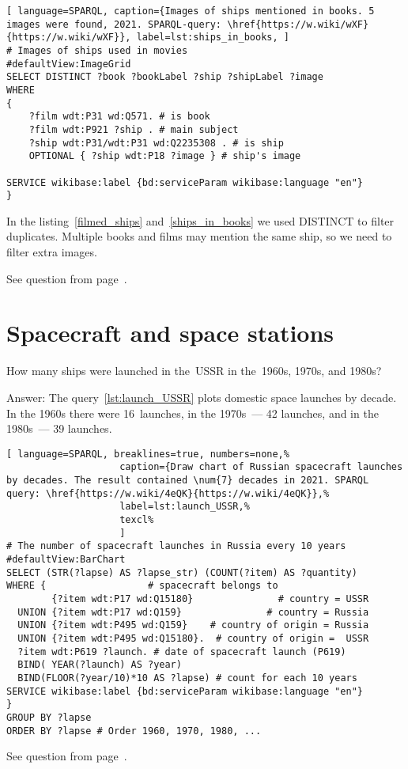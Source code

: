 \begin{lstlisting}[ language=SPARQL, caption={Images of ships mentioned in books. 5 images were found, 2021. SPARQL-query: \href{https://w.wiki/wXF}{https://w.wiki/wXF}}, label=lst:ships_in_books, ]
# Images of ships used in movies
#defaultView:ImageGrid
SELECT DISTINCT ?book ?bookLabel ?ship ?shipLabel ?image
WHERE
{
	?film wdt:P31 wd:Q571. # is book	
	?film wdt:P921 ?ship . # main subject
	?ship wdt:P31/wdt:P31 wd:Q2235308 . # is ship
	OPTIONAL { ?ship wdt:P18 ?image } # ship's image
										
SERVICE wikibase:label {bd:serviceParam wikibase:language "en"}
}
\end{lstlisting}

In the listing~\ref{filmed_ships} and~\ref{ships_in_books} we used DISTINCT to filter duplicates. Multiple books and films may mention the same ship, so we need to filter extra images.

\small{See question from page~\pageref{question:ship_3}.}


\section{Spacecraft and space stations}
\label{answer:launches_USSR}
\begin{exercise}
	How many ships were launched in the~USSR in the~1960s, 1970s, and 1980s?
\end{exercise}
Answer: The query~\ref{lst:launch_USSR} plots domestic space launches by decade. In the 1960s there were 16~launches, in the 1970s~--- 42 launches, and in the 1980s~--- 39 launches.
\begin{lstlisting}[ language=SPARQL, breaklines=true, numbers=none,%
                    caption={Draw chart of Russian spacecraft launches by decades. The result contained \num{7} decades in 2021. SPARQL query: \href{https://w.wiki/4eQK}{https://w.wiki/4eQK}},%
                    label=lst:launch_USSR,%
                    texcl%
                    ]
# The number of spacecraft launches in Russia every 10 years
#defaultView:BarChart
SELECT (STR(?lapse) AS ?lapse_str) (COUNT(?item) AS ?quantity)
WHERE {                  # spacecraft belongs to
        {?item wdt:P17 wd:Q15180}               # country = USSR
  UNION {?item wdt:P17 wd:Q159}               # country = Russia
  UNION {?item wdt:P495 wd:Q159}    # country of origin = Russia
  UNION {?item wdt:P495 wd:Q15180}.  # country of origin =  USSR
  ?item wdt:P619 ?launch. # date of spacecraft launch (P619)
  BIND( YEAR(?launch) AS ?year) 
  BIND(FLOOR(?year/10)*10 AS ?lapse) # count for each 10 years
SERVICE wikibase:label {bd:serviceParam wikibase:language "en"}
} 
GROUP BY ?lapse
ORDER BY ?lapse # Order 1960, 1970, 1980, ...
\end{lstlisting}%
\small{See question from page~\pageref{question:spacecraft_1}.}


